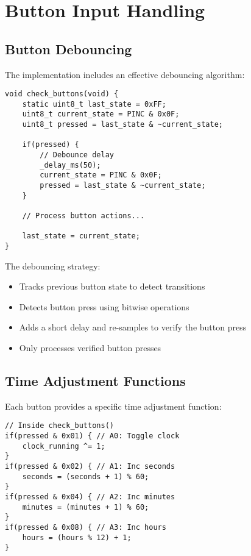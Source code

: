 \documentclass[12pt,a4paper]{article}
\begin{document}
\section{Button Input Handling}

\subsection{Button Debouncing}

The implementation includes an effective debouncing algorithm:

\begin{lstlisting}
void check_buttons(void) {
    static uint8_t last_state = 0xFF;
    uint8_t current_state = PINC & 0x0F;
    uint8_t pressed = last_state & ~current_state;

    if(pressed) {
        // Debounce delay
        _delay_ms(50);
        current_state = PINC & 0x0F;
        pressed = last_state & ~current_state;
    }
    
    // Process button actions...
    
    last_state = current_state;
}
\end{lstlisting}

The debouncing strategy:
\begin{itemize}
    \item Tracks previous button state to detect transitions
    \item Detects button press using bitwise operations
    \item Adds a short delay and re-samples to verify the button press
    \item Only processes verified button presses
\end{itemize}

\subsection{Time Adjustment Functions}

Each button provides a specific time adjustment function:

\begin{lstlisting}
// Inside check_buttons()
if(pressed & 0x01) { // A0: Toggle clock
    clock_running ^= 1;
}
if(pressed & 0x02) { // A1: Inc seconds
    seconds = (seconds + 1) % 60;
}
if(pressed & 0x04) { // A2: Inc minutes
    minutes = (minutes + 1) % 60;
}
if(pressed & 0x08) { // A3: Inc hours
    hours = (hours % 12) + 1;
}
\end{lstlisting}
\end{document}
